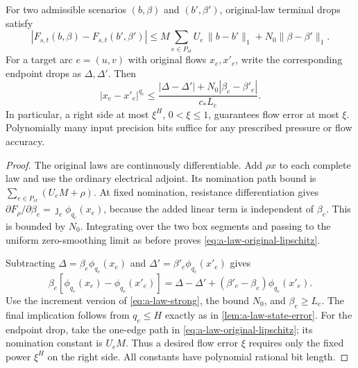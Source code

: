 \begin{lemma}
\label{lem:a-law-fractional-rounding}
For two admissible scenarios $(b,\beta)$ and $(b',\beta')$, original-law
terminal drops satisfy
\begin{equation}
 |F_{s,t}(b,\beta)-F_{s,t}(b',\beta')|
 \le M\sum_{e\in P_{st}}U_e\,\|b-b'\|_1
                     +N_0\|\beta-\beta'\|_1.
 \label{eq:a-law-original-lipschitz}
\end{equation}
For a target arc $e=(u,v)$ with original flows $x_e,x'_e$, write the
corresponding endpoint drops as $\Delta,\Delta'$. Then
\begin{equation}
 |x_e-x'_e|^{q_e}\le
 \frac{|\Delta-\Delta'|+N_0|\beta_e-\beta'_e|}{c_*L_e}.
 \label{eq:a-law-inverse-rounding}
\end{equation}
In particular, a right side at most $\xi^H$, $0<\xi\le1$, guarantees
flow error at most $\xi$. Polynomially many input precision bits suffice
for any prescribed pressure or flow accuracy.
\end{lemma}
\begin{proof}
The original laws are continuously differentiable. Add $\rho x$ to each
complete law and use the ordinary electrical adjoint. Its nomination
path bound is $\sum_{e\in P_{st}}(U_eM+\rho)$. At fixed nomination,
resistance differentiation gives
$\partial F_\rho/\partial\beta_e=\jmath_e\phi_{q_e}(x_e)$, because the
added linear term is independent of $\beta_e$. This is bounded by
$N_0$. Integrating over the two box segments and passing to the uniform
zero-smoothing limit as before proves \cref{eq:a-law-original-lipschitz}.

Subtracting $\Delta=\beta_e\phi_{q_e}(x_e)$ and
$\Delta'=\beta'_e\phi_{q_e}(x'_e)$ gives
\[
 \beta_e[\phi_{q_e}(x_e)-\phi_{q_e}(x'_e)]
       =\Delta-\Delta'+(\beta'_e-\beta_e)\phi_{q_e}(x'_e).
\]
Use the increment version of \cref{eq:a-law-strong}, the bound $N_0$,
and $\beta_e\ge L_e$. The final implication follows from $q_e\le H$
exactly as in \cref{lem:a-law-state-error}. For the endpoint drop, take
the one-edge path in \cref{eq:a-law-original-lipschitz}; its nomination
constant is $U_eM$. Thus a desired flow error $\xi$ requires only the
fixed power $\xi^H$ on the right side. All constants have polynomial
rational bit length.
\end{proof}


